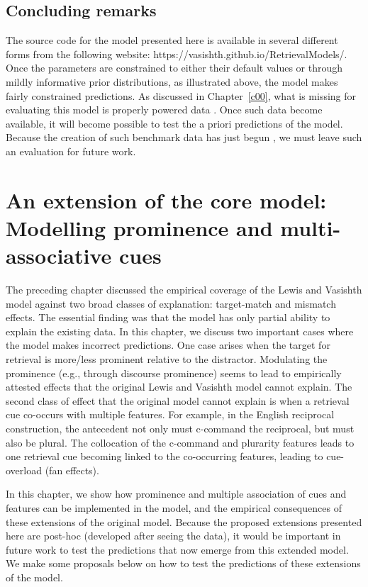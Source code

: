 \documentclass{cambridge7A}\usepackage[]{graphicx}\usepackage[]{color}
\begin{document}
\section{Concluding remarks}

The source code for the model presented here is available in several different forms from the following website: https://vasishth.github.io/RetrievalModels/. Once the parameters are constrained to either their default values or through mildly informative prior distributions, as illustrated above, the model makes fairly constrained predictions. As discussed in Chapter~\ref{c00}, what is missing for evaluating this model is properly powered data \citep{rp}. Once such data become available, it will become possible to test the a priori predictions of the model. Because the creation of such benchmark data has just begun \citep{VasishthMertzenJaegerGelman2018,JaegerMertzenVanDykeVasishth2019,MertzenEtAlAMLaP2019}, we must leave such an evaluation for future work. 


\chapter[Extension: Prominence and multi-associative cues]{An extension of the core model: Modelling prominence and multi-associative cues} \label{c02prominence}

The preceding chapter discussed the empirical coverage of the Lewis and Vasishth model against two broad classes of explanation: target-match and mismatch effects. The essential finding was that the model has only partial ability to explain the existing data. In this chapter, we discuss two important cases where the model makes incorrect predictions. One case arises when the target for retrieval is more/less  prominent relative to the distractor. Modulating the prominence (e.g., through discourse prominence) seems to lead to empirically attested effects that the original Lewis and Vasishth model cannot explain. The second class of effect that the original model cannot explain is when a retrieval cue co-occurs with multiple features. For example, in the English reciprocal construction, the antecedent not only must c-command the reciprocal, but must also be plural. The collocation of the c-command and plurarity features leads to one retrieval cue becoming linked to the co-occurring features, leading to cue-overload (fan effects). 

In this chapter, we show how prominence and multiple association of cues and features can be implemented in the model, and the empirical consequences of these extensions of the original model. Because the proposed extensions presented here are post-hoc (developed after seeing the data), it would be important in future work to test the predictions that now emerge from this extended model. We make some proposals below on how to test the predictions of these extensions of the model.
\end{document}
